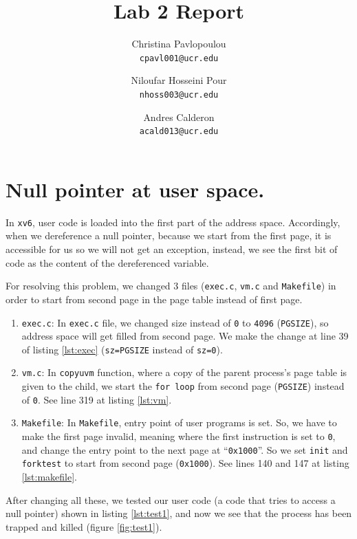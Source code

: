 \documentclass[a4paper,10pt]{scrartcl}
\title{Lab 2 Report}
\author{
   Christina Pavlopoulou\\
  \small \texttt{cpavl001@ucr.edu}
  \and
   Niloufar Hosseini Pour\\
  \small \texttt{nhoss003@ucr.edu}
  \and
   Andres Calderon\\
  \small \texttt{acald013@ucr.edu}
}
\begin{document}
\maketitle

\section{Null pointer at user space.}
In \texttt{xv6}, user code is loaded into the first part of the address space. Accordingly, when we dereference a null pointer,  because we start from the first page, it is accessible for us so we will not get an exception, instead, we see the first bit of code as the content of the dereferenced variable.

For resolving this problem, we changed 3 files (\texttt{exec.c}, \texttt{vm.c} and \texttt{Makefile}) in order to start from second page in the page table instead of first page.

\begin{enumerate}
 \item \texttt{exec.c}: In \texttt{exec.c} file, we changed size instead of \texttt{0} to \texttt{4096} (\texttt{PGSIZE}), so address space will get filled from second page.  We make the change at line 39 of listing \ref{lst:exec} (\texttt{sz=PGSIZE} instead of \texttt{sz=0}).
 \item \texttt{vm.c}: In \texttt{copyuvm} function, where a copy of the parent process's page table is given to the child, we start the \texttt{for loop} from second page (\texttt{PGSIZE}) instead of \texttt{0}.  See line 319 at listing \ref{lst:vm}.
 \item \texttt{Makefile}: In \texttt{Makefile}, entry point of user programs is set. So, we have to make the first page invalid, meaning where the first instruction is set to \texttt{0}, and change the entry point to the next page at ``\texttt{0x1000}''. So we set \texttt{init} and \texttt{forktest} to start from second page (\texttt{0x1000}). See lines 140 and 147 at listing \ref{lst:makefile}.
\end{enumerate}

After changing all these, we tested our user code (a code that tries to access a null pointer) shown in listing \ref{lst:test1}, and now we see that the process has been trapped and killed (figure \ref{fig:test1}).

\end{document}
